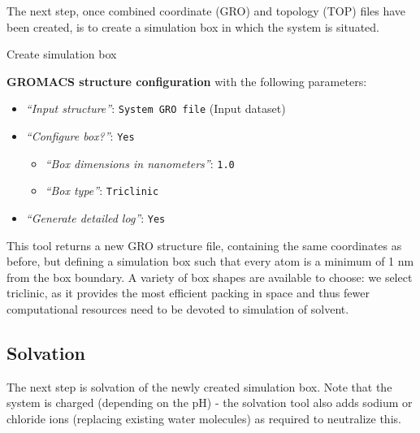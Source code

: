 \documentclass[twocolumn]{bmcart}%
\providecommand{\tightlist}{%
  \setlength{\itemsep}{0pt}\setlength{\parskip}{0pt}}
\begin{document}
The next step, once combined coordinate (GRO) and topology (TOP) files
have been created, is to create a simulation box in which the system is
situated.

\begin{handson_box_colour}{Create simulation box}


  \textbf{GROMACS structure configuration} with the following
  parameters:

  \begin{itemize}
  \item
    \emph{``Input structure''}: \texttt{System\ GRO\ file} (Input
    dataset)
  \item
    \emph{``Configure box?''}: \texttt{Yes}

    \begin{itemize}
    \item
      \emph{``Box dimensions in nanometers''}: \texttt{1.0}
    \item
      \emph{``Box type''}: \texttt{Triclinic}
    \end{itemize}
  \item
    \emph{``Generate detailed log''}: \texttt{Yes}
  \end{itemize}

\end{handson_box_colour}

This tool returns a new GRO structure file, containing the same coordinates as before, but defining a simulation box such that every atom is a minimum of 1 nm from the box boundary. A variety of box shapes are available to choose: we select triclinic, as it provides the most efficient packing in space and thus fewer computational resources need to be devoted to simulation of solvent. 

\subsection*{Solvation}\label{solvation}
The next step is solvation of the newly created simulation box. Note
that the system is charged (depending on the pH) - the solvation tool
also adds sodium or chloride ions (replacing existing water molecules) as required to neutralize this.
\end{document}
